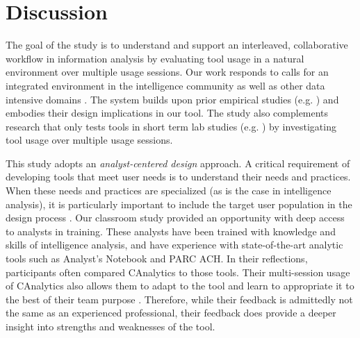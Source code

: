 \section{Discussion}\label{discussion}

The goal of the study is to understand and support an interleaved, collaborative workflow in information analysis by evaluating tool usage in a natural
environment over multiple usage sessions. Our work responds to calls for an
integrated environment in the intelligence community as well as other data
intensive domains \citep{Shah2014i, Chen2016, Vision2015, Amershi2015, Ware2012}.
The system builds upon prior empirical studies (e.g. \cite{Carroll2013,
	Borge2012,Kang2011,Chin2009}) and embodies their design implications in our
tool. The study also complements research that only tests tools in short term
lab studies (e.g. \cite{Convertino2011,Goyal2016,Hajizadeh2013}) by
investigating tool usage over multiple usage sessions.

This study adopts an \emph{analyst-centered design} approach. A critical
requirement of developing tools that meet user needs is to understand their
needs and practices. When these needs and practices are specialized (as is the
case in intelligence analysis), it is particularly important to include the
target user population in the design process \citep{Scholtz2014}. Our classroom
study provided an opportunity with deep access to analysts in training. These
analysts have been trained with knowledge and skills of intelligence analysis,
and have experience with state-of-the-art analytic tools such as Analyst's
Notebook and PARC ACH. In their reflections, participants often compared
CAnalytics to those tools. Their multi-session usage of CAnalytics also allows
them to adapt to the tool and learn to appropriate it to the best of their team
purpose \citep{Stahl2006}. Therefore, while their feedback is admittedly not the
same as an experienced professional, their feedback does provide a deeper
insight into strengths and weaknesses of the tool.

